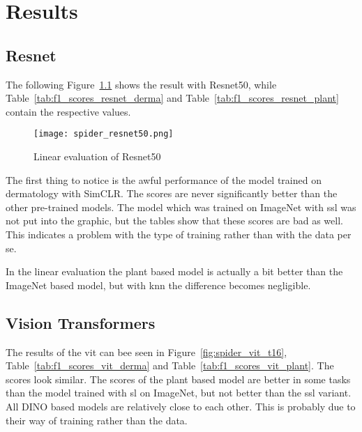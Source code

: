 \chapter{Results}

\section{Resnet}


The following Figure~\ref{fig:spider_resnet50} shows the result with Resnet50, while Table~\ref{tab:f1_scores_resnet_derma} and Table~\ref{tab:f1_scores_resnet_plant} contain the respective values.
\begin{figure}[H]
    \begin{center}
    \texttt{[image: spider\_resnet50.png]}
    \caption{Linear evaluation of Resnet50}\label{fig:spider_resnet50}
    \end{center}
\end{figure}

The first thing to notice is the awful performance of the model trained on dermatology with SimCLR. The scores are never significantly better than the other pre-trained models. The model which was trained on ImageNet with \gls{ssl} was not put into the graphic, but the tables show that these scores are bad as well. 
This indicates a problem with the type of training rather than with the data per se.

In the linear evaluation the plant based model is actually a bit better than the ImageNet based model, but with \gls{knn} the difference becomes negligible.



\section{Vision Transformers}

The results of the \gls{vit} can bee seen in Figure~\ref{fig:spider_vit_t16}, Table~\ref{tab:f1_scores_vit_derma} and Table~\ref{tab:f1_scores_vit_plant}. 
The scores look similar. The scores of the plant based model are better in some tasks than the model trained with \gls{sl} on ImageNet, but not better than the \gls{ssl} variant. All DINO based models are relatively close to each other. This is probably due to their way of training rather than the data.

